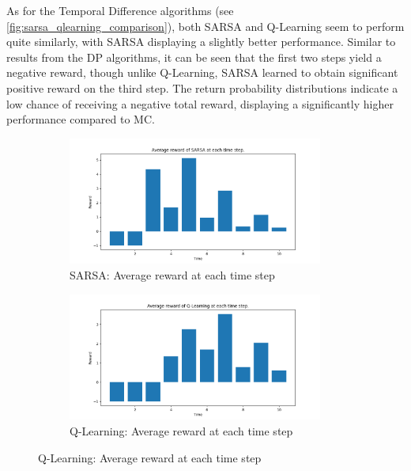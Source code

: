 \documentclass{class}
\begin{document}
\noindent As for the Temporal Difference algorithms (see \autoref{fig:sarsa_qlearning_comparison}), both SARSA and Q-Learning seem to perform quite similarly, with SARSA displaying a slightly better performance. Similar to results from the DP algorithms, it can be seen that the first two steps yield a negative reward, though unlike Q-Learning, SARSA learned to obtain significant positive reward on the third step. The return probability distributions indicate a low chance of receiving a negative total reward, displaying a significantly higher performance compared to MC.

\begin{figure}[H]
    \centering
    \begin{subfigure}[t]{0.47\linewidth}
        \centering
        \includegraphics[height=4.2cm]{plots/r_over_time/sarsa_r_over_time.png}
        \caption{SARSA: Average reward at each time step}
        \label{fig:sarsa_r_over_time}
    \end{subfigure}
    \hspace{0.03\linewidth}
    \begin{subfigure}[t]{0.47\linewidth}
        \centering
        \includegraphics[height=4.2cm]{plots/r_over_time/q_learning_r_over_time.png}
        \caption{Q-Learning: Average reward at each time step}
        \label{fig:qlearning_r_over_time}
    \end{subfigure}

    \vspace{0.5cm} %


\end{figure}
\end{document}
